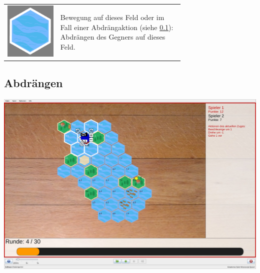 \documentclass[12pt,a4paper, ngerman, oneside]{scrartcl}
\begin{document}
\begin{table}[h!]
\begin{tabular}{ c m{0.7\linewidth} }
\begin{minipage}{1cm}
      \includegraphics[width=\linewidth]{bilder/water-marked}
    \end{minipage}
    &
    Bewegung auf dieses Feld oder im Fall einer Abdrängaktion (siehe \ref{sec:push}): Abdrängen des Gegners auf dieses Feld.
  \end{tabular}
\end{table}

\subsection{Abdrängen}\label{sec:push}

\begin{centering}
  \includegraphics[width=\textwidth]{bilder/spielfeld-abdraengen.jpg}
\end{centering}
\end{document}
